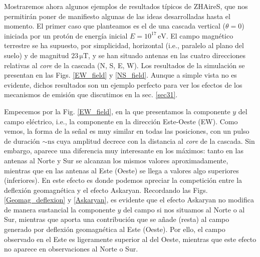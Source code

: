 \documentclass[12 pt, a4paper]{article} %
\numberwithin{equation}{section}
\numberwithin{figure}{section}
\numberwithin{table}{section}
\begin{document}
Mostraremos ahora algunos ejemplos de resultados típicos de ZHAireS, que nos permitirán poner de manifiesto algunas de las ideas desarrolladas hasta el momento. El primer caso que planteamos es el de una cascada vertical ($\theta=0$) iniciada por un protón de energía inicial $E=10^{17}\,\mathrm{eV}$. El campo magnético terrestre se ha supuesto, por simplicidad, horizontal (i.e., paralelo al plano del suelo) y de magnitud $23\,\mathrm{\mu T}$, y se han situado antenas en las cuatro direcciones relativas al \textit{core} de la cascada (N, S, E, W). Los resultados de la simulación se presentan en las Figs. \ref{EW_field} y \ref{NS_field}. Aunque a simple vista no es evidente, dichos resultados son un ejemplo perfecto para ver los efectos de los mecanismos de emisión que discutimos en la sec. \ref{sec31}. 

Empecemos por la Fig. \ref{EW_field}, en la que presentamos la componente $y$ del campo eléctrico, i.e., la componente en la dirección Este-Oeste (EW). Como vemos, la forma de la señal es muy similar en todas las posiciones, con un pulso de duración $\sim \mathrm{ns}$ cuya amplitud decrece con la distancia al \textit{core} de la cascada. Sin embargo, aparece una diferencia muy interesante en los máximos: tanto en las antenas al Norte y Sur se alcanzan los mismos valores aproximadamente, mientras que en las antenas al Este (Oeste) se llega a valores algo superiores (inferiores). En este efecto es donde podemos apreciar la competición entre la deflexión geomagnética y el efecto Askaryan. Recordando las Figs. \ref{Geomag_deflexion} y \ref{Askaryan}, es evidente que el efecto Askaryan no modifica de manera sustancial la componente $y$ del campo si nos situamos al Norte o al Sur, mientras que aporta una contribución que se añade (resta) al campo generado por deflexión geomagnética al Este (Oeste). Por ello, el campo observado en el Este es ligeramente superior al del Oeste, mientras que este efecto no aparece en observaciones al Norte o Sur.
\end{document}
